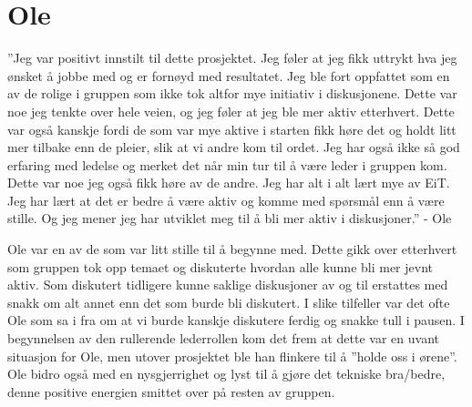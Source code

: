 \section{Ole}
''Jeg var positivt innstilt til dette prosjektet. 
Jeg føler at jeg fikk uttrykt hva jeg ønsket å jobbe med og er fornøyd med resultatet.
Jeg ble fort oppfattet som en av de rolige i gruppen som ikke tok altfor mye initiativ i diskusjonene. 
Dette var noe jeg tenkte over hele veien, og jeg føler at jeg ble mer aktiv etterhvert. 
Dette var også kanskje fordi de som var mye aktive i starten fikk høre det og holdt litt mer tilbake enn de pleier, slik at vi andre kom til ordet.
Jeg har også ikke så god erfaring med ledelse og merket det når min tur til å være leder i gruppen kom. 
Dette var noe jeg også fikk høre av de andre.
Jeg har alt i alt lært mye av EiT. 
Jeg har lært at det er bedre å være aktiv og komme med spørsmål enn å være stille. 
Og jeg mener jeg har utviklet meg til å bli mer aktiv i diskusjoner.'' \hfill - Ole
\vspace{\secspace}

Ole var en av de som var litt stille til å begynne med. 
Dette gikk over etterhvert som gruppen tok opp temaet og diskuterte hvordan alle kunne bli mer jevnt aktiv. 
Som diskutert tidligere kunne saklige diskusjoner av og til erstattes med snakk om alt annet enn det som burde bli diskutert. 
I slike tilfeller var det ofte Ole som sa i fra om at vi burde kanskje diskutere ferdig og snakke tull i pausen. 
I begynnelsen av den rullerende lederrollen kom det frem at dette var en uvant situasjon for Ole, men utover prosjektet ble han flinkere til å ''holde oss i ørene''. 
Ole bidro også med en nysgjerrighet og lyst til å gjøre det tekniske bra/bedre, denne positive energien smittet over på resten av gruppen. 
